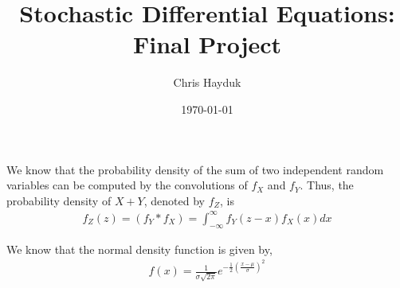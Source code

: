 \documentclass[12pt]{article}
\newenvironment{problem}[2][Problem]{\begin{trivlist}
\item[\hskip \labelsep {\bfseries #1}\hskip \labelsep {\bfseries #2.}]}{\end{trivlist}}
\begin{document}
\title{Stochastic Differential Equations: Final Project}

\author{Chris Hayduk}
\date{\today}

\maketitle

\begin{problem}{1}
\end{problem}

We know that the probability density of the sum of two independent random variables can be computed by the convolutions of $f_X$ and $f_Y$. Thus, the probability density of $X + Y$, denoted by $f_Z$, is
\begin{align}
f_Z(z) = (f_Y*f_X) = \int_{-\infty}^{\infty}  f_Y(z - x)f_X(x) dx
\end{align}

We know that the normal density function is given by,
\begin{align*}
f(x) = \frac{1}{\sigma\sqrt{2\pi}} e^{-\frac{1}{2}\left(\frac{x-\mu}{\sigma}\right)^2}
\end{align*}
\end{document}
